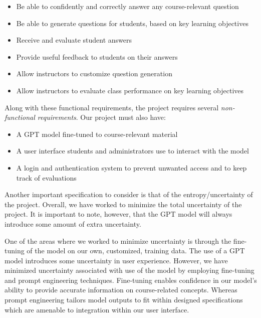 \documentclass[12pt,a4paper]{article}
\begin{document}
    \begin{itemize}
        \label{functionalReqs}

        \item Be able to confidently and correctly answer any course-relevant question
        \item Be able to generate questions for students, based on key learning objectives
        \item Receive and evaluate student answers
        \item Provide useful feedback to students on their answers
        \item Allow instructors to customize question generation
        \item Allow instructors to evaluate class performance on key learning objectives
    \end{itemize}

    Along with these functional requirements, the project requires several \textit{non-functional
    requirements}.  Our project must also have:

    \begin{itemize}
        \label{nonFunctionalReqs}
        \item A GPT model fine-tuned to course-relevant material
        \item A user interface students and administrators use to interact with the model
        \item A login and authentication system to prevent unwanted access and to keep track of evaluations
    \end{itemize}

    Another important specification to consider is that of the entropy/uncertainty of the project.
    Overall, we have worked to minimize the total uncertainty of the project.  It is important to note,
    however, that the GPT model will always introduce some amount of extra uncertainty.

    One of the areas where we worked to minimize uncertainty is through the fine-tuning of the model on our
    own, customized, training data. The use of a GPT model introduces some uncertainty in user experience.
    However, we have minimized uncertainty associated with use of the model by employing fine-tuning
    and prompt engineering techniques. Fine-tuning enables confidence in our model's ability to provide
    accurate information on course-related concepts. Whereas prompt engineering tailors model outputs
    to fit within designed specifications which are amenable to integration within our user interface.
\end{document}
